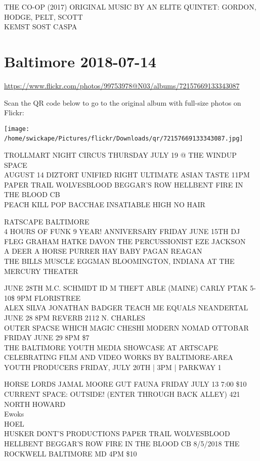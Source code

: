 \documentclass[10pt,letterpaper]{article}
\begin{document}
THE CO{-}OP (2017) ORIGINAL MUSIC BY AN ELITE QUINTET: GORDON, HODGE, PELT, SCOTT\\
KEMST SOST CASPA
\

\section*{Baltimore 2018-07-14}

\url{https://www.flickr.com/photos/99753978@N03/albums/72157669133343087}

Scan the QR code below to go to the original album with full-size photos on Flickr:

\texttt{[image: /home/swickape/Pictures/flickr/Downloads/qr/72157669133343087.jpg]}
\

TROLLMART NIGHT CIRCUS THURSDAY JULY 19 @ THE WINDUP SPACE\\
AUGUST 14 DIZTORT UNIFIED RIGHT ULTIMATE ASIAN TASTE 11PM\\
PAPER TRAIL WOLVESBLOOD BEGGAR'S ROW HELLBENT FIRE IN THE BLOOD CB\\
PEACH KILL POP BACCHAE INSATIABLE HIGH NO HAIR

RATSCAPE BALTIMORE\\
4 HOURS OF FUNK 9 YEAR! ANNIVERSARY FRIDAY JUNE 15TH DJ FLEG GRAHAM HATKE DAVON THE PERCUSSIONIST EZE JACKSON\\
A DEER A HORSE PURRER HAY BABY PAGAN REAGAN\\
THE BILLS MUSCLE EGGMAN BLOOMINGTON, INDIANA AT THE MERCURY THEATER

JUNE 28TH M.C. SCHMIDT ID M THEFT ABLE (MAINE) CARLY PTAK 5{-}10\$ 9PM FLORISTREE\\
ALEX SILVA JONATHAN BADGER TEACH ME EQUALS NEANDERTAL JUNE 28 8PM REVERB 2112 N. CHARLES\\
OUTER SPACSE WHICH MAGIC CHESHI MODERN NOMAD OTTOBAR FRIDAY JUNE 29 8PM \$7\\
THE BALTIMORE YOUTH MEDIA SHOWCASE AT ARTSCAPE CELEBRATING FILM AND VIDEO WORKS BY BALTIMORE{-}AREA YOUTH PRODUCERS FRIDAY, JULY 20TH | 3PM | PARKWAY 1

HORSE LORDS JAMAL MOORE GUT FAUNA FRIDAY JULY 13 7:00 \$10 CURRENT SPACE: OUTSIDE!  (ENTER THROUGH BACK ALLEY) 421 NORTH HOWARD\\
Ewoks\\
HOEL\\
HUSKER DONT'S PRODUCTIONS PAPER TRAIL WOLVESBLOOD HELLBENT BEGGAR'S ROW FIRE IN THE BLOOD CB 8/5/2018 THE ROCKWELL BALTIMORE MD 4PM \$10
\end{document}
